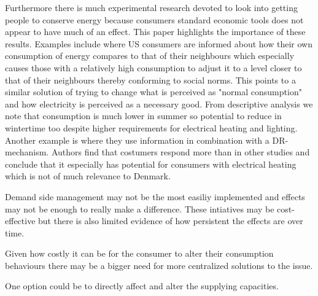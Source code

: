Furthermore there is much experimental research devoted to look into getting people to conserve energy because consumers standard economic tools does not appear to have much of an effect. This paper highlights the importance of these results. Examples include \citep{allcott2011social} where US consumers are informed about how their own consumption of energy compares to that of their neighbours which especially causes those with a relatively high consumption to adjust it to a level closer to that of their neighbours thereby conforming to social norms. This points to a similar solution of trying to change what is perceived as "normal consumption" and how electricity is perceived as a necessary good. From descriptive analysis we note that consumption is much lower in summer so potential to reduce in wintertime too despite higher requirements for electrical heating and lighting. Another example is \citep{saele2011demand} where they use information in combination with a DR-mechanism. Authors find that costumers respond more than in other studies and conclude that it especially has potential for consumers with electrical heating which is not of much relevance to Denmark.
\par

Demand side management may not be the most easiliy implemented and effects may not be enough to really make a difference. These intiatives may be cost-effective but there is also limited evidence of how persistent the effects are over time.

\par %
Given how costly it can be for the consumer to alter their consumption behaviours there may be a bigger need for more centralized solutions to the issue.

One option could be to directly affect and alter the supplying capacities.

